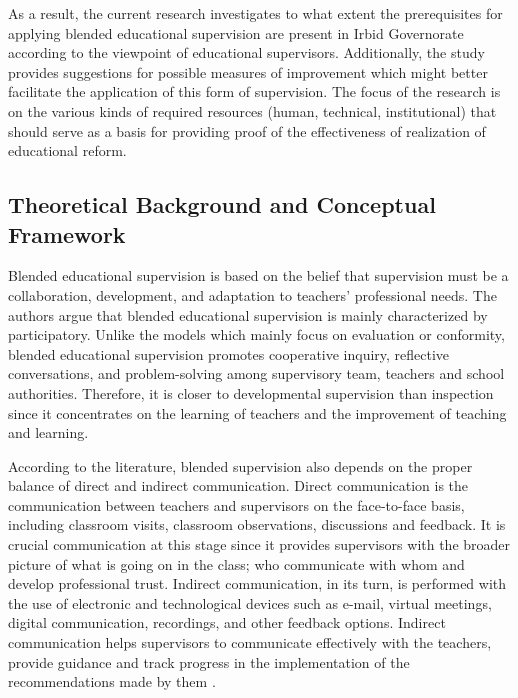 \documentclass[10pt]{NSP1}
\begin{document}
As a result, the current research investigates to what extent the prerequisites for applying blended educational supervision are present in Irbid Governorate according to the viewpoint of educational supervisors. Additionally, the study provides suggestions for possible measures of improvement which might better facilitate the application of this form of supervision. The focus of the research is on the various kinds of required resources (human, technical, institutional) that should serve as a basis for providing proof of the effectiveness of realization of educational reform.

\subsection{Theoretical Background and Conceptual Framework}

Blended educational supervision is based on the belief that supervision must be a collaboration, development, and adaptation to teachers' professional needs. The authors \cite{ref14} argue that blended educational supervision is mainly characterized by participatory. Unlike the models which mainly focus on evaluation or conformity, blended educational supervision promotes cooperative inquiry, reflective conversations, and problem-solving among supervisory team, teachers and school authorities. Therefore, it is closer to developmental supervision than inspection since it concentrates on the learning of teachers and the improvement of teaching and learning.

According to the literature, blended supervision also depends on the proper balance of direct and indirect communication. Direct communication is the communication between teachers and supervisors on the face-to-face basis, including classroom visits, classroom observations, discussions and feedback. It is crucial communication at this stage since it provides supervisors with the broader picture of what is going on in the class; who communicate with whom and develop professional trust. Indirect communication, in its turn, is performed with the use of electronic and technological devices such as e-mail, virtual meetings, digital communication, recordings, and other feedback options. Indirect communication helps supervisors to communicate effectively with the teachers, provide guidance and track progress in the implementation of the recommendations made by them \cite{ref15}.
\end{document}

